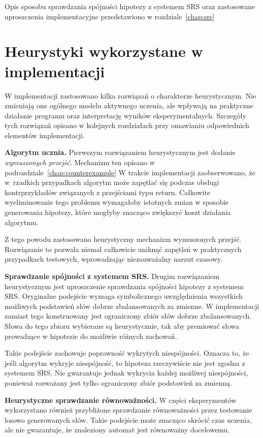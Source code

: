 Opis sposobu sprawdzania spójności hipotezy z systemem SRS oraz zastosowane uproszczenia implementacyjne
przedstawiono w rozdziale~\ref{chap:srs}

\section{Heurystyki wykorzystane w implementacji}

W implementacji zastosowano kilka rozwiązań o charakterze heurystycznym. Nie zmieniają one ogólnego modelu aktywnego uczenia,
ale wpływają na praktyczne działanie programu oraz interpretację wyników eksperymentalnych. Szczegóły tych
rozwiązań opisano w kolejnych rozdziałach przy omawianiu odpowiednich elementów implementacji.

\textbf{Algorytm ucznia.}
Pierwszym rozwiązaniem heurystycznym jest dodanie \emph{wymuszonych przejść}.
Mechanizm ten opisano w podrozdziale~\ref{chap:counterexample} W trakcie implementacji zaobserwowano,
że w~rzadkich przypadkach algorytm może zapętlać się podczas obsługi kontrprzykładów
związanych z przejściami typu return. Całkowite wyeliminowanie tego problemu wymagałoby
istotnych zmian w sposobie generowania hipotezy, które mogłyby znacząco zwiększyć koszt działania algorytmu.

Z tego powodu zastosowano heurystyczny mechanizm wymuszonych przejść. Rozwiązanie to pozwala niemal
całkowicie uniknąć zapętleń w praktycznych przypadkach testowych, wprowadzając niezauważalny narzut czasowy.

\textbf{Sprawdzanie spójności z systemem SRS.}
Drugim rozwiązaniem heurystycznym jest uproszczenie sprawdzania spójności hipotezy z systemem SRS.
Oryginalne podejście wymaga symbolicznego uwzględnienia wszystkich możliwych podstawień słów dobrze
zbalansowanych za zmienne. W implementacji zamiast tego konstruowany jest ograniczony zbiór słów
dobrze zbalansowanych. Słowa do tego zbioru wybierane są heurystycznie, tak aby premiować słowa prowadzące
w hipotezie do możliwie różnych zachowań.

Takie podejście zachowuje poprawność wykrytych niespójności. Oznacza to, że jeśli algorytm wykryje
niespójność, to hipoteza rzeczywiście nie jest zgodna z systemem SRS. Nie gwarantuje jednak wykrycia
każdej możliwej niespójności, ponieważ rozważany jest tylko ograniczony zbiór podstawień za zmienną.

\textbf{Heurystyczne sprawdzanie równoważności.}
W części eksperymentów wykorzystano również przybliżone sprawdzanie równoważności przez testowanie
losowo generowanych słów. Takie podejście może znacząco skrócić czas uczenia, ale nie gwarantuje, że
znaleziony automat jest równoważny docelowemu.